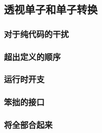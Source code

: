 \documentclass[./main.tex]{subfiles}
\begin{document}
\subsection*{透视单子和单子转换}

\subsubsection*{对于纯代码的干扰}

\subsubsection*{超出定义的顺序}

\subsubsection*{运行时开支}

\subsubsection*{笨拙的接口}

\subsubsection*{将全部合起来}
\end{document}
